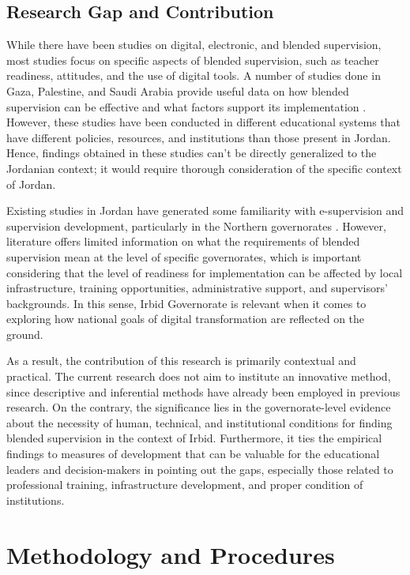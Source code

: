 \documentclass[10pt]{NSP1}
\begin{document}
\subsection{Research Gap and Contribution}

While there have been studies on digital, electronic, and blended supervision, most studies focus on specific aspects of blended supervision, such as teacher readiness, attitudes, and the use of digital tools. A number of studies done in Gaza, Palestine, and Saudi Arabia provide useful data on how blended supervision can be effective and what factors support its implementation \cite{ref27,ref23,ref28}. However, these studies have been conducted in different educational systems that have different policies, resources, and institutions than those present in Jordan. Hence, findings obtained in these studies can't be directly generalized to the Jordanian context; it would require thorough consideration of the specific context of Jordan.

Existing studies in Jordan have generated some familiarity with e-supervision and supervision development, particularly in the Northern governorates \cite{ref18,ref22}. However, literature offers limited information on what the requirements of blended supervision mean at the level of specific governorates, which is important considering that the level of readiness for implementation can be affected by local infrastructure, training opportunities, administrative support, and supervisors' backgrounds. In this sense, Irbid Governorate is relevant when it comes to exploring how national goals of digital transformation are reflected on the ground.

As a result, the contribution of this research is primarily contextual and practical. The current research does not aim to institute an innovative method, since descriptive and inferential methods have already been employed in previous research. On the contrary, the significance lies in the governorate-level evidence about the necessity of human, technical, and institutional conditions for finding blended supervision in the context of Irbid. Furthermore, it ties the empirical findings to measures of development that can be valuable for the educational leaders and decision-makers in pointing out the gaps, especially those related to professional training, infrastructure development, and proper condition of institutions.

\section{Methodology and Procedures}
\end{document}
